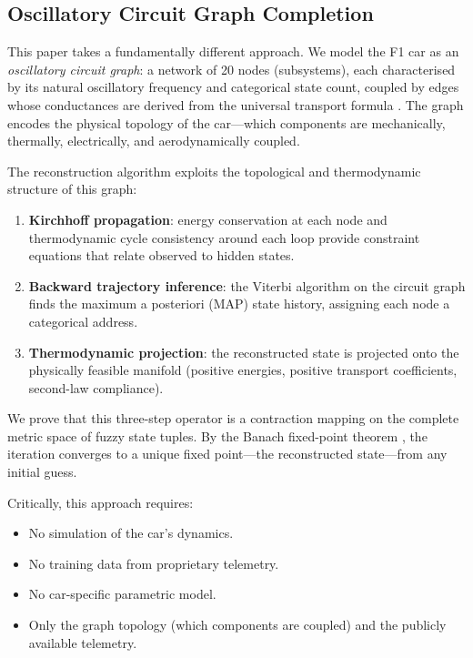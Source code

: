 \documentclass[twocolumn,10pt,a4paper]{article}
\theoremstyle{definition}
\theoremstyle{remark}
\begin{document}
\subsection{Oscillatory Circuit Graph Completion}

This paper takes a fundamentally different approach. We model the F1 car as an \emph{oscillatory circuit graph}: a network of 20 nodes (subsystems), each characterised by its natural oscillatory frequency and categorical state count, coupled by edges whose conductances are derived from the universal transport formula \citep{Sachikonye2026circuitgraph}. The graph encodes the physical topology of the car---which components are mechanically, thermally, electrically, and aerodynamically coupled.

The reconstruction algorithm exploits the topological and thermodynamic structure of this graph:
\begin{enumerate}[label=(\roman*)]
    \item \textbf{Kirchhoff propagation}: energy conservation at each node and thermodynamic cycle consistency around each loop provide constraint equations that relate observed to hidden states.
    \item \textbf{Backward trajectory inference}: the Viterbi algorithm on the circuit graph finds the maximum a posteriori (MAP) state history, assigning each node a categorical address.
    \item \textbf{Thermodynamic projection}: the reconstructed state is projected onto the physically feasible manifold (positive energies, positive transport coefficients, second-law compliance).
\end{enumerate}

We prove that this three-step operator is a contraction mapping on the complete metric space of fuzzy state tuples. By the Banach fixed-point theorem \citep{Banach1922}, the iteration converges to a unique fixed point---the reconstructed state---from any initial guess.

Critically, this approach requires:
\begin{itemize}
    \item No simulation of the car's dynamics.
    \item No training data from proprietary telemetry.
    \item No car-specific parametric model.
    \item Only the graph topology (which components are coupled) and the publicly available telemetry.
\end{itemize}
\end{document}
